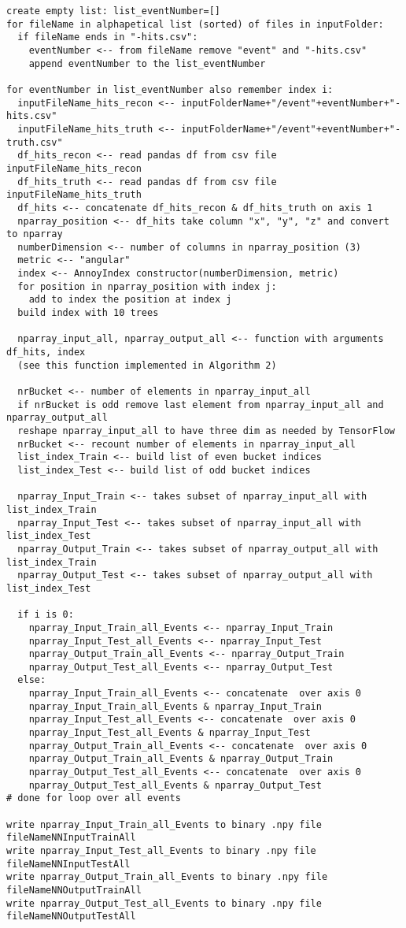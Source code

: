 \begin{verbatim}
create empty list: list_eventNumber=[]
for fileName in alphapetical list (sorted) of files in inputFolder:
  if fileName ends in "-hits.csv":
    eventNumber <-- from fileName remove "event" and "-hits.csv"
    append eventNumber to the list_eventNumber

for eventNumber in list_eventNumber also remember index i:
  inputFileName_hits_recon <-- inputFolderName+"/event"+eventNumber+"-hits.csv"
  inputFileName_hits_truth <-- inputFolderName+"/event"+eventNumber+"-truth.csv"
  df_hits_recon <-- read pandas df from csv file inputFileName_hits_recon
  df_hits_truth <-- read pandas df from csv file inputFileName_hits_truth
  df_hits <-- concatenate df_hits_recon & df_hits_truth on axis 1
  nparray_position <-- df_hits take column "x", "y", "z" and convert to nparray
  numberDimension <-- number of columns in nparray_position (3)
  metric <-- "angular"
  index <-- AnnoyIndex constructor(numberDimension, metric)
  for position in nparray_position with index j:
    add to index the position at index j
  build index with 10 trees 

  nparray_input_all, nparray_output_all <-- function with arguments df_hits, index 
  (see this function implemented in Algorithm 2)

  nrBucket <-- number of elements in nparray_input_all
  if nrBucket is odd remove last element from nparray_input_all and nparray_output_all 
  reshape nparray_input_all to have three dim as needed by TensorFlow
  nrBucket <-- recount number of elements in nparray_input_all
  list_index_Train <-- build list of even bucket indices
  list_index_Test <-- build list of odd bucket indices

  nparray_Input_Train <-- takes subset of nparray_input_all with list_index_Train
  nparray_Input_Test <-- takes subset of nparray_input_all with list_index_Test
  nparray_Output_Train <-- takes subset of nparray_output_all with list_index_Train
  nparray_Output_Test <-- takes subset of nparray_output_all with list_index_Test

  if i is 0:
    nparray_Input_Train_all_Events <-- nparray_Input_Train
    nparray_Input_Test_all_Events <-- nparray_Input_Test
    nparray_Output_Train_all_Events <-- nparray_Output_Train
    nparray_Output_Test_all_Events <-- nparray_Output_Test
  else:
    nparray_Input_Train_all_Events <-- concatenate  over axis 0
    nparray_Input_Train_all_Events & nparray_Input_Train
    nparray_Input_Test_all_Events <-- concatenate  over axis 0
    nparray_Input_Test_all_Events & nparray_Input_Test
    nparray_Output_Train_all_Events <-- concatenate  over axis 0
    nparray_Output_Train_all_Events & nparray_Output_Train
    nparray_Output_Test_all_Events <-- concatenate  over axis 0
    nparray_Output_Test_all_Events & nparray_Output_Test
# done for loop over all events

write nparray_Input_Train_all_Events to binary .npy file fileNameNNInputTrainAll
write nparray_Input_Test_all_Events to binary .npy file fileNameNNInputTestAll
write nparray_Output_Train_all_Events to binary .npy file fileNameNNOutputTrainAll
write nparray_Output_Test_all_Events to binary .npy file fileNameNNOutputTestAll
\end{verbatim}


